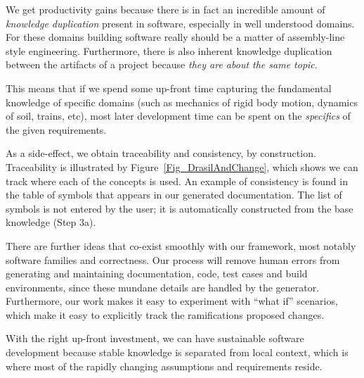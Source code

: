 \documentclass[a4paper,UKenglish,cleveref,autoref,thm-restate]{oasics-v2021}
\begin{document}
We get productivity gains because there is in fact an incredible amount of
\emph{knowledge duplication} present in software, especially in well understood
domains. For these domains building software really should be a matter of
assembly-line style engineering. Furthermore, there is also inherent knowledge
duplication between the artifacts of a project because \emph{they are about the
same topic}.

This means that if we spend some up-front time capturing the fundamental
knowledge of specific domains (such as mechanics of rigid body motion, dynamics
of soil, trains, etc), most later development time can be spent on the
\emph{specifics} of the given requirements.

As a side-effect, we obtain traceability and consistency, by construction.
Traceability is illustrated by Figure~\ref{Fig_DrasilAndChange}, which shows we
can track where each of the concepts is used.  An example of consistency is
found in the table of symbols that appears in our generated documentation.  The
list of symbols is not entered by the user; it is automatically constructed from
the base knowledge (Step 3a).

There are further ideas that co-exist smoothly with our framework, most notably
software families and correctness.  Our process will remove human errors from
generating and maintaining documentation, code, test cases and build
environments, since these mundane details are handled by the generator.
Furthermore, our work makes it easy to experiment with ``what if'' scenarios,
which make it easy to explicitly track the ramifications proposed changes.  

With the right up-front investment, we can have sustainable software development
because stable knowledge is separated from local context, which is where most of
the rapidly changing assumptions and requirements reside.




\end{document}
